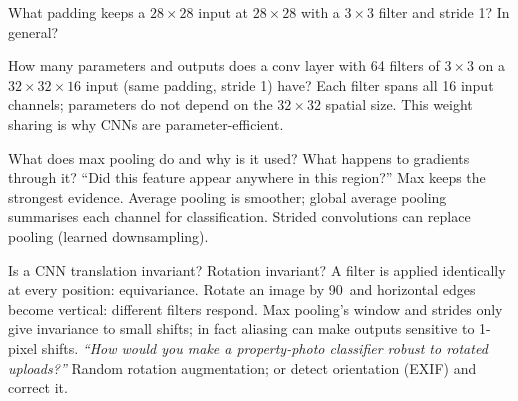 \begin{qa}{ What padding keeps a $28\times28$ input at $28\times28$ with a $3\times3$ filter and stride 1? In general?}
\end{qa}

\begin{qa}{ How many parameters and outputs does a conv layer with 64 filters of $3\times3$ on a $32\times32\times16$ input (same
padding, stride 1) have?}
\why Each filter spans all 16 input channels; parameters do not depend on the $32\times32$ spatial size. This weight sharing is why CNNs are parameter-efficient.
\end{qa}

\begin{qa}{ What does max pooling do and why is it used? What happens to gradients through it?}
\why ``Did this feature appear anywhere in this region?'' Max keeps the strongest evidence. Average pooling is smoother; global average pooling summarises each
channel for classification. Strided convolutions can replace pooling (learned downsampling).
\end{qa}

\begin{qa}{ Is a CNN translation invariant? Rotation invariant?}
\why A filter is applied identically at every position: equivariance. Rotate an image by 90\textdegree\ and horizontal edges become vertical: different filters respond.
Max pooling's window and strides only give invariance to small shifts; in fact aliasing can make outputs sensitive to 1-pixel shifts.
\pushes \emph{``How would you make a property-photo classifier robust to rotated uploads?''} Random rotation augmentation; or detect orientation (EXIF) and correct it.
\end{qa}

